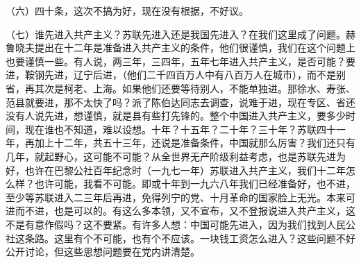 （六）四十条，这次不搞为好，现在没有根据，不好议。

（七）谁先进入共产主义？苏联先进入还是我国先进入？在我们这里成了问题。赫鲁晓夫提出在十二年是准备进入共产主义的条件，他们很谨慎，我们在这个问题上也要谨慎一些。有人说，两三年，三四年，五年七年进入共产主义，是否可能？要进，鞍钢先进，辽宁后进，（他们二千四百万人中有八百万人在城市），而不是别省，再其次是柯老、上海。如果他们还要等待别人，不能单独进。那徐水、寿张、范县就要进，那不太快了吗？派了陈伯达同志去调查，说难于进，现在专区、省还没有人说先进，想谨慎，就是县有些打先锋的。整个中国进入共产主义，要多少时间，现在谁也不知道，难以设想。十年？十五年？二十年？三十年？苏联四十一年，再加上十二年，共五十三年，还说是准备条件，中国就那么厉害？我们还只有几年，就起野心，这可能不可能？从全世界无产阶级利益考虑，也是苏联先进为好，也许在巴黎公社百年纪念时（一九七一年）苏联进入共产主义，我们十二年怎么样？也许可能，我看不可能。即或十年到一九六八年我们已经准备好，也不进，至少等苏联进入二三年后再进，免得列宁的党、十月革命的国家脸上无光。本来可进而不进，也是可以的。有这么多本领，又不宣布，又不登报说进入共产主义，这不是有意作假吗？这不要紧。有许多人想：中国可能先进入，因为我们找到人民公社这条路。这里有个不可能，也有个不应该。一块钱工资怎么进入？这些问题不好公开讨论，但这些思想问题要在党内讲清楚。


